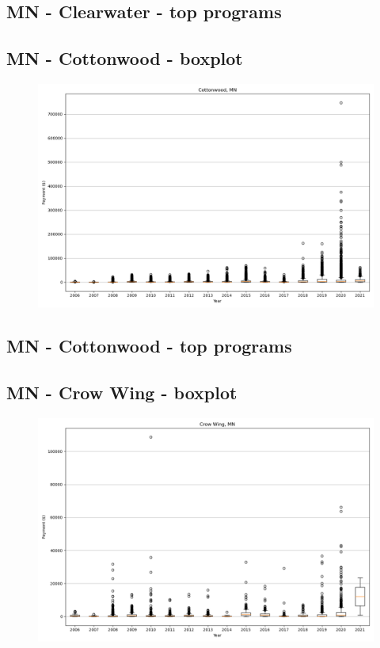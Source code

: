 \subsection*{MN - Clearwater - top programs}

\newpage
\subsection*{MN - Cottonwood - boxplot}
\begin{figure}[h]
\centering
\includegraphics[width=7in]{../output/boxplots/counties/Cottonwood-MN_boxplot.png}
\end{figure}


\subsection*{MN - Cottonwood - top programs}

\newpage
\subsection*{MN - Crow Wing - boxplot}
\begin{figure}[h]
\centering
\includegraphics[width=7in]{../output/boxplots/counties/Crow Wing-MN_boxplot.png}
\end{figure}


